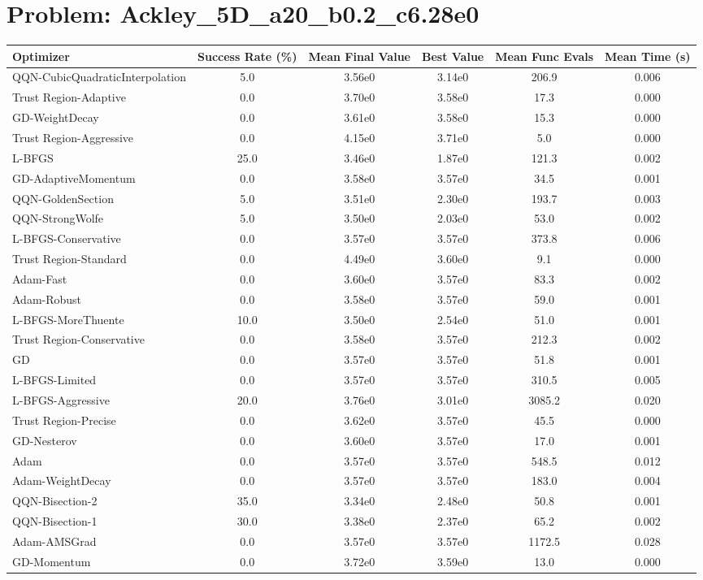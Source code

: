 \documentclass{article}
\begin{document}
\section{Problem: Ackley\_5D\_a20\_b0.2\_c6.28e0}
\begin{longtable}{p{3cm}*{5}{c}}
\toprule
\textbf{Optimizer} & \textbf{Success Rate (\%)} & \textbf{Mean Final Value} & \textbf{Best Value} & \textbf{Mean Func Evals} & \textbf{Mean Time (s)} \\
\midrule
QQN-CubicQuadraticInterpolation & 5.0 & 3.56e0 & 3.14e0 & 206.9 & 0.006 \\
Trust Region-Adaptive & 0.0 & 3.70e0 & 3.58e0 & 17.3 & 0.000 \\
GD-WeightDecay & 0.0 & 3.61e0 & 3.58e0 & 15.3 & 0.000 \\
Trust Region-Aggressive & 0.0 & 4.15e0 & 3.71e0 & 5.0 & 0.000 \\
L-BFGS & 25.0 & 3.46e0 & 1.87e0 & 121.3 & 0.002 \\
GD-AdaptiveMomentum & 0.0 & 3.58e0 & 3.57e0 & 34.5 & 0.001 \\
QQN-GoldenSection & 5.0 & 3.51e0 & 2.30e0 & 193.7 & 0.003 \\
QQN-StrongWolfe & 5.0 & 3.50e0 & 2.03e0 & 53.0 & 0.002 \\
L-BFGS-Conservative & 0.0 & 3.57e0 & 3.57e0 & 373.8 & 0.006 \\
Trust Region-Standard & 0.0 & 4.49e0 & 3.60e0 & 9.1 & 0.000 \\
Adam-Fast & 0.0 & 3.60e0 & 3.57e0 & 83.3 & 0.002 \\
Adam-Robust & 0.0 & 3.58e0 & 3.57e0 & 59.0 & 0.001 \\
L-BFGS-MoreThuente & 10.0 & 3.50e0 & 2.54e0 & 51.0 & 0.001 \\
Trust Region-Conservative & 0.0 & 3.58e0 & 3.57e0 & 212.3 & 0.002 \\
GD & 0.0 & 3.57e0 & 3.57e0 & 51.8 & 0.001 \\
L-BFGS-Limited & 0.0 & 3.57e0 & 3.57e0 & 310.5 & 0.005 \\
L-BFGS-Aggressive & 20.0 & 3.76e0 & 3.01e0 & 3085.2 & 0.020 \\
Trust Region-Precise & 0.0 & 3.62e0 & 3.57e0 & 45.5 & 0.000 \\
GD-Nesterov & 0.0 & 3.60e0 & 3.57e0 & 17.0 & 0.001 \\
Adam & 0.0 & 3.57e0 & 3.57e0 & 548.5 & 0.012 \\
Adam-WeightDecay & 0.0 & 3.57e0 & 3.57e0 & 183.0 & 0.004 \\
QQN-Bisection-2 & 35.0 & 3.34e0 & 2.48e0 & 50.8 & 0.001 \\
QQN-Bisection-1 & 30.0 & 3.38e0 & 2.37e0 & 65.2 & 0.002 \\
Adam-AMSGrad & 0.0 & 3.57e0 & 3.57e0 & 1172.5 & 0.028 \\
GD-Momentum & 0.0 & 3.72e0 & 3.59e0 & 13.0 & 0.000 \\
\bottomrule
\end{longtable}
\end{document}
